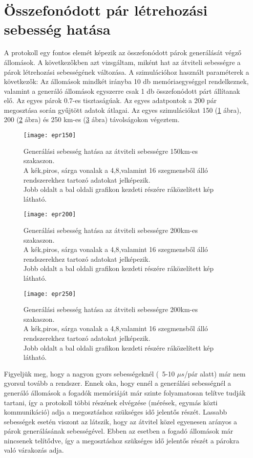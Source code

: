 \section{Összefonódott pár létrehozási sebesség hatása}

A protokoll egy fontos elemét képezik az összefonódott párok generálását végző állomások. A következőkben azt vizsgáltam, miként hat az átviteli sebességre a párok létrehozási sebességének változása. A szimulációhoz használt paraméterek a következők: Az állomások mindkét irányba 10 db memóriaegységgel rendelkeznek, valamint a generáló állomások egyszerre csak 1 db összefonódott párt állítanak elő. Az egyes párok 0.7-es tisztaságúak. Az egyes adatpontok a 200 pár megosztása során gyűjtött adatok átlagai. Az egyes szimulációkat 150 (\ref{fig:rate150} ábra), 200 (\ref{fig:rate200} ábra) és 250 km-es (\ref{fig:rate250} ábra) távolságokon végeztem.
\begin{figure}[H]
\centering
\texttt{[image: epr150]}
\caption[Generálási sebesség hatása(150km)]{Generálási sebesség hatása az átviteli sebességre 150km-es szakaszon.\\
A kék,piros, sárga vonalak a 4,8,valamint 16 szegmensből álló rendszerekhez tartozó adatokat jelképezik.\\
Jobb oldalt a bal oldali grafikon kezdeti részére ráközelített kép látható.
}
\label{fig:rate150}
\end{figure}
\begin{figure}[H]
\centering
\texttt{[image: epr200]}
\caption[Generálási sebesség hatása(200km)]{Generálási sebesség hatása az átviteli sebességre 200km-es szakaszon.\\
A kék,piros, sárga vonalak a 4,8,valamint 16 szegmensből álló rendszerekhez tartozó adatokat jelképezik.\\
Jobb oldalt a bal oldali grafikon kezdeti részére ráközelített kép látható.
}
\label{fig:rate200}
\end{figure}
\begin{figure}[H]
\centering
\texttt{[image: epr250]}
\caption[Generálási sebesség hatása(200km)]{Generálási sebesség hatása az átviteli sebességre 200km-es szakaszon.\\
A kék,piros, sárga vonalak a 4,8,valamint 16 szegmensből álló rendszerekhez tartozó adatokat jelképezik.\\
Jobb oldalt a bal oldali grafikon kezdeti részére ráközelített kép látható.
}
\label{fig:rate250}
\end{figure}
Figyeljük meg, hogy a nagyon gyors sebességeknél (~5-10 $\mu s$/pár alatt) már nem gyorsul tovább a rendszer. Ennek oka, hogy ennél a generálási sebességnél a generáló állomások a fogadók memóriáját már szinte folyamatosan telítve tudják tartani, így a protokoll többi részének elvégzése (mérések, egymás közti kommunikáció) adja a megosztáshoz szükséges idő jelentős részét. Lassabb sebességek esetén viszont az látszik, hogy az átvitel közel egyenesen arányos a párok generálásának sebességével. Ebben az esetben a fogadó állomások már nincsenek telítődve, így a megosztáshoz szükséges idő jelentős részét a párokra való várakozás adja.


